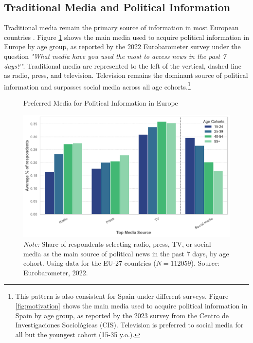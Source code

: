 \documentclass[12pt]{article}
\begin{document}
	\label{sec:context}
	
		\subsection{Traditional Media and Political Information}
	
	Traditional media remain the primary source of information in most European countries \citep{europarl2024}. Figure \ref{fig:motivation2} shows the main media used to acquire political information in Europe by age group, as reported by the 2022 Eurobarometer survey under the question \textit{"What media have you used the most to access news in the past 7 days?"}. Traditional media are represented to the left of the vertical, dashed line as radio, press, and television. Television remains the dominant source of political information and  surpasses social media across all age cohorts.\footnote{This pattern is also consistent for Spain under different surveys. Figure \ref{fig:motivation} shows the main media used to acquire political information in Spain by age group, as reported by the 2023 survey from the Centro de Investigaciones Sociológicas (CIS). Television is preferred to social media for all but the youngest cohort (15-35 y.o.). 
	}
	
	
	
	\begin{figure}[!htb]
		\centering
		\caption{Preferred Media for Political Information in Europe}
		\includegraphics[width=130mm]{figures/age_cohorts_full}
		\caption*{\small \textit{Note:} Share of respondents selecting radio, press, TV, or social media as the main source of political news in the past 7 days, by age cohort. Using data for the EU-27 countries  ($N=112059$). 
			Source: Eurobarometer, 2022. }
		\label{fig:motivation2}
	\end{figure}
	
\end{document}
